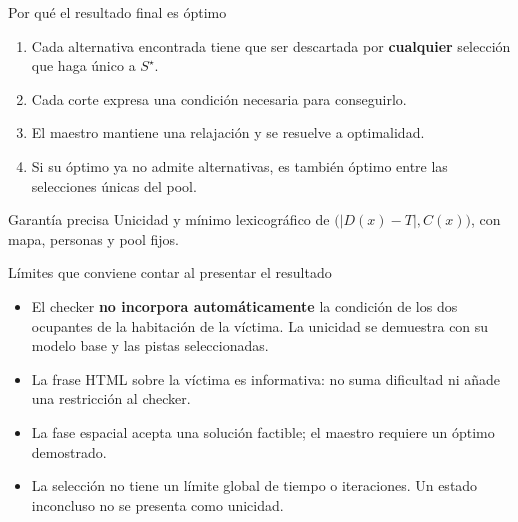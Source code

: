\documentclass[aspectratio=169,11pt]{beamer}
\begin{document}
\begin{frame}{Por qu\'e el resultado final es \'optimo}
  \begin{enumerate}
    \setlength{\itemsep}{4mm}
    \item Cada alternativa encontrada tiene que ser descartada por
      \textbf{cualquier} selecci\'on que haga \'unico a \(S^\star\).
    \item Cada corte expresa una condici\'on necesaria para conseguirlo.
    \item El maestro mantiene una relajaci\'on y se resuelve a optimalidad.
    \item Si su \'optimo ya no admite alternativas, es tambi\'en
      \'optimo entre las selecciones \'unicas del pool.
  \end{enumerate}
  \begin{block}{Garant\'ia precisa}
    Unicidad y m\'inimo lexicogr\'afico de
    \(\bigl(|D(x)-T|,C(x)\bigr)\), con mapa, personas y pool fijos.
  \end{block}
\end{frame}

\begin{frame}{L\'imites que conviene contar al presentar el resultado}
  \begin{itemize}
    \setlength{\itemsep}{4mm}
    \item El checker \textbf{no incorpora autom\'aticamente} la condici\'on
      de los dos ocupantes de la habitaci\'on de la v\'ictima.
      La unicidad se demuestra con su modelo base y las pistas seleccionadas.
    \item La frase HTML sobre la v\'ictima es informativa:
      no suma dificultad ni a\~nade una restricci\'on al checker.
    \item La fase espacial acepta una soluci\'on factible;
      el maestro requiere un \'optimo demostrado.
    \item La selecci\'on no tiene un l\'imite global de tiempo o iteraciones.
      Un estado inconcluso no se presenta como unicidad.
  \end{itemize}
\end{frame}
\end{document}
